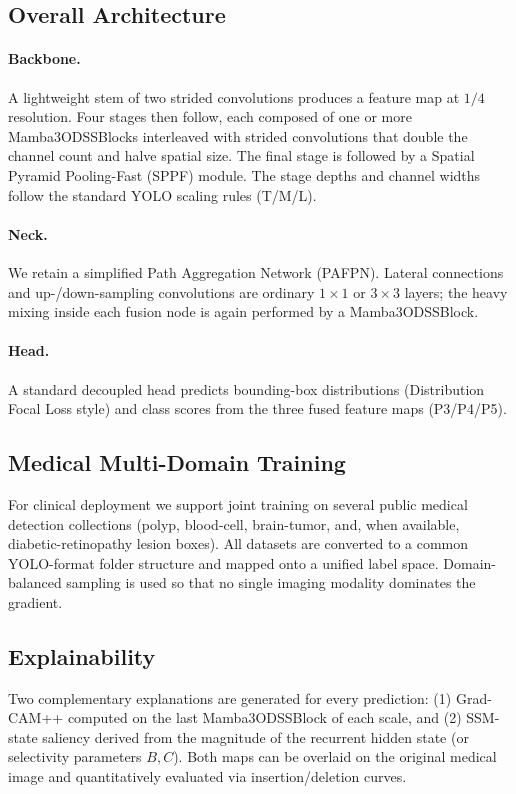 \documentclass[10pt,twocolumn,letterpaper]{article}
\begin{document}
\subsection{Overall Architecture}
\paragraph{Backbone.}
A lightweight stem of two strided convolutions produces a feature map at \(1/4\) resolution. Four stages then follow, each composed of one or more Mamba3ODSSBlocks interleaved with strided convolutions that double the channel count and halve spatial size. The final stage is followed by a Spatial Pyramid Pooling-Fast (SPPF) module. The stage depths and channel widths follow the standard YOLO scaling rules (T/M/L).

\paragraph{Neck.}
We retain a simplified Path Aggregation Network (PAFPN). Lateral connections and up-/down-sampling convolutions are ordinary \(1\times1\) or \(3\times3\) layers; the heavy mixing inside each fusion node is again performed by a Mamba3ODSSBlock.

\paragraph{Head.}
A standard decoupled head predicts bounding-box distributions (Distribution Focal Loss style) and class scores from the three fused feature maps (P3/P4/P5).

\subsection{Medical Multi-Domain Training}
For clinical deployment we support joint training on several public medical detection collections (polyp, blood-cell, brain-tumor, and, when available, diabetic-retinopathy lesion boxes). All datasets are converted to a common YOLO-format folder structure and mapped onto a unified label space. Domain-balanced sampling is used so that no single imaging modality dominates the gradient.

\subsection{Explainability}
Two complementary explanations are generated for every prediction: (1) Grad-CAM++ computed on the last Mamba3ODSSBlock of each scale, and (2) SSM-state saliency derived from the magnitude of the recurrent hidden state (or selectivity parameters \(B,C\)). Both maps can be overlaid on the original medical image and quantitatively evaluated via insertion/deletion curves.
\end{document}
